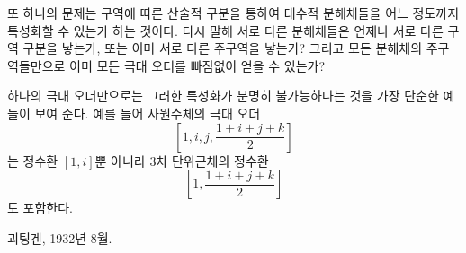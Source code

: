 또 하나의 문제는 구역에 따른 산술적 구분을 통하여 대수적 분해체들을 어느 정도까지 특성화할 수 있는가 하는 것이다. 다시 말해 서로 다른 분해체들은 언제나 서로 다른 구역 구분을 낳는가, 또는 이미 서로 다른 주구역을 낳는가? 그리고 모든 분해체의 주구역들만으로 이미 모든 극대 오더를 빠짐없이 얻을 수 있는가?

하나의 극대 오더만으로는 그러한 특성화가 분명히 불가능하다는 것을 가장 단순한 예들이 보여 준다. 예를 들어 사원수체의 극대 오더
\[
\left[1,i,j,\frac{1+i+j+k}{2}\right]
\]
는 정수환 $[1,i]$뿐 아니라 3차 단위근체의 정수환
\[
\left[1,\frac{1+i+j+k}{2}\right]
\]
도 포함한다.

\begin{flushleft}
괴팅겐, 1932년 8월.
\end{flushleft}
